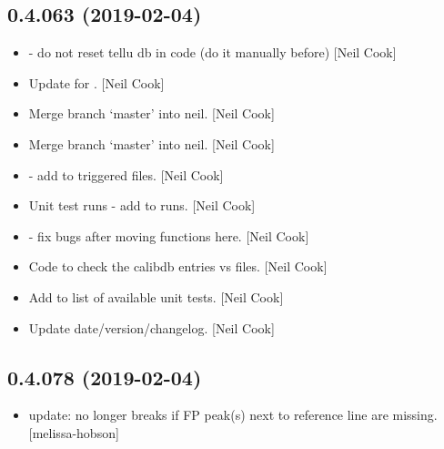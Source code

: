 \documentclass[a4paper,10pt,english]{report}
\begin{document}
\subsection{0.4.063 (2019-02-04)}
\label{\detokenize{misc/changelog:id195}}\begin{itemize}
\item {} 
 - do not reset tellu db in code (do it manually
before) {[}Neil Cook{]}

\item {} 
Update  for . {[}Neil Cook{]}

\item {} 
Merge branch ‘master’ into neil. {[}Neil Cook{]}

\item {} 
Merge branch ‘master’ into neil. {[}Neil Cook{]}

\item {} 
 - add  to triggered files. {[}Neil
Cook{]}

\item {} 
Unit test runs - add  to runs. {[}Neil Cook{]}

\item {} 
 - fix bugs after moving functions here. {[}Neil Cook{]}

\item {} 
Code to check the calibdb entries vs files. {[}Neil Cook{]}

\item {} 
Add  to list of available unit tests. {[}Neil Cook{]}

\item {} 
Update date/version/changelog. {[}Neil Cook{]}

\end{itemize}


\subsection{0.4.078 (2019-02-04)}
\label{\detokenize{misc/changelog:id196}}\begin{itemize}
\item {} 
 update: no longer breaks if FP peak(s) next to reference
line are missing. {[}melissa-hobson{]}

\end{itemize}
\end{document}
